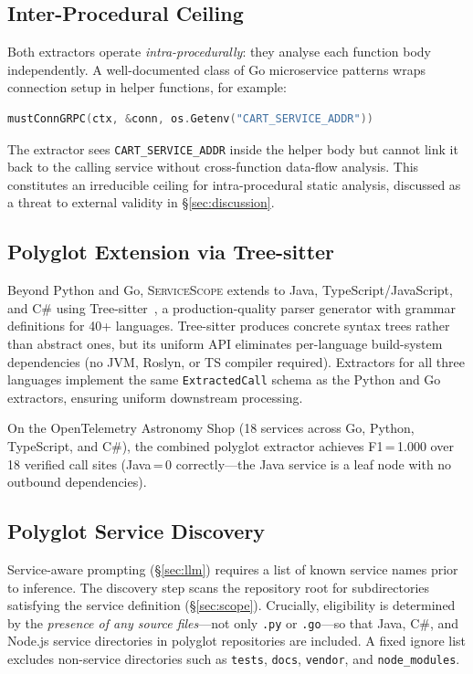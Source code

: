 \documentclass[runningheads]{llncs}
\begin{document}
\subsection{Inter-Procedural Ceiling}

Both extractors operate \emph{intra-procedurally}: they analyse each
function body independently. A well-documented class of Go microservice
patterns wraps connection setup in helper functions, for example:

\begin{lstlisting}[language=Go, caption={}]
mustConnGRPC(ctx, &conn, os.Getenv("CART_SERVICE_ADDR"))
\end{lstlisting}

The extractor sees \texttt{CART\_SERVICE\_ADDR} inside the helper body but
cannot link it back to the calling service without cross-function data-flow
analysis. This constitutes an irreducible ceiling for intra-procedural
static analysis, discussed as a threat to external validity in
\S\ref{sec:discussion}.

\subsection{Polyglot Extension via Tree-sitter}

Beyond Python and Go, \textsc{ServiceScope} extends to Java, TypeScript/JavaScript,
and C\# using Tree-sitter~\cite{treesitter}, a production-quality parser
generator with grammar definitions for 40+ languages. Tree-sitter produces
concrete syntax trees rather than abstract ones, but its uniform API
eliminates per-language build-system dependencies (no JVM, Roslyn, or TS
compiler required). Extractors for all three languages implement the same
\texttt{ExtractedCall} schema as the Python and Go extractors, ensuring
uniform downstream processing.

On the OpenTelemetry Astronomy Shop (18 services across Go, Python,
TypeScript, and C\#), the combined polyglot extractor achieves
F1\,=\,1.000 over 18 verified call sites (Java\,=\,0 correctly---the Java
service is a leaf node with no outbound dependencies).

\subsection{Polyglot Service Discovery}

Service-aware prompting (\S\ref{sec:llm}) requires a list of known service
names prior to inference. The discovery step scans the repository root for
subdirectories satisfying the service definition (\S\ref{sec:scope}).
Crucially, eligibility is determined by the \emph{presence of any source
files}---not only \texttt{.py} or \texttt{.go}---so that Java, C\#, and
Node.js service directories in polyglot repositories are included. A fixed
ignore list excludes non-service directories such as \texttt{tests},
\texttt{docs}, \texttt{vendor}, and \texttt{node\_modules}.
\end{document}
